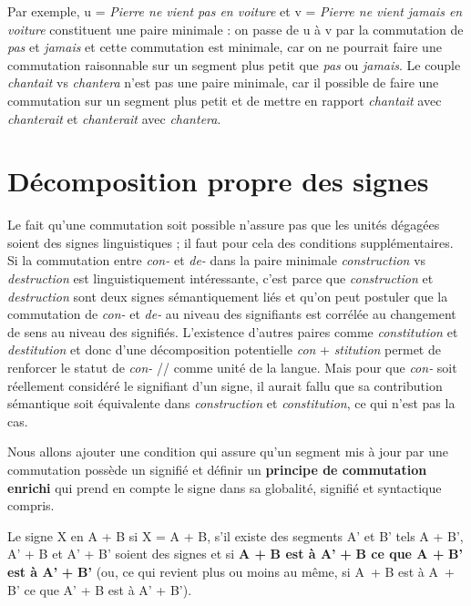 Par exemple, u = \textit{Pierre ne vient pas en voiture} et v = \textit{Pierre ne vient jamais en voiture} constituent une paire minimale : on passe de u à v par la commutation de \textit{pas} et \textit{jamais} et cette commutation est minimale, car on ne pourrait faire une commutation raisonnable sur un segment plus petit que \textit{pas} ou \textit{jamais}. Le couple \textit{chantait} vs \textit{chantera} n’est pas une paire minimale, car il possible de faire une commutation sur un segment plus petit et de mettre en rapport \textit{chantait} avec \textit{chanterait} et \textit{chanterait} avec \textit{chantera}.

\section{Décomposition propre des signes}\label{sec:2.2.2}

Le fait qu’une commutation soit possible n’assure pas que les unités dégagées soient des signes linguistiques ; il faut pour cela des conditions supplémentaires. Si la commutation entre \textit{con-} et \textit{de-} dans la paire minimale \textit{construction} vs \textit{destruction} est linguistiquement intéressante, c’est parce que \textit{construction} et \textit{destruction} sont deux signes sémantiquement liés et qu’on peut postuler que la commutation de \textit{con-} et \textit{de-} au niveau des signifiants est corrélée au changement de sens au niveau des signifiés. L’existence d’autres paires comme \textit{constitution} et \textit{destitution} et donc d’une décomposition potentielle \textit{con} + \textit{stitution} permet de renforcer le statut de \textit{con-} // comme unité de la langue. Mais pour que \textit{con-} soit réellement considéré le signifiant d’un signe, il aurait fallu que sa contribution sémantique soit équivalente dans \textit{construction} et \textit{constitution}, ce qui n’est pas la cas.

Nous allons ajouter une condition qui assure qu’un segment mis à jour par une commutation possède un signifié et définir un \textbf{principe de commutation enrichi} qui prend en compte le signe dans sa globalité, signifié et syntactique compris.

\begin{styleLivreImportant}
Le signe X  en A + B si X = A + B, s’il existe des segments A’ et B’ tels A + B’, A’ + B et A’ + B’ soient des signes et si \textbf{A +} \textbf{B est à A’} \textbf{+} \textbf{B ce que A +} \textbf{B’} \textbf{est à A’} \textbf{+} \textbf{B’} (ou, ce qui revient plus ou moins au même, si A~+ B est à A~+ B’ ce que A’ + B est à A’ + B’).
\end{styleLivreImportant}

